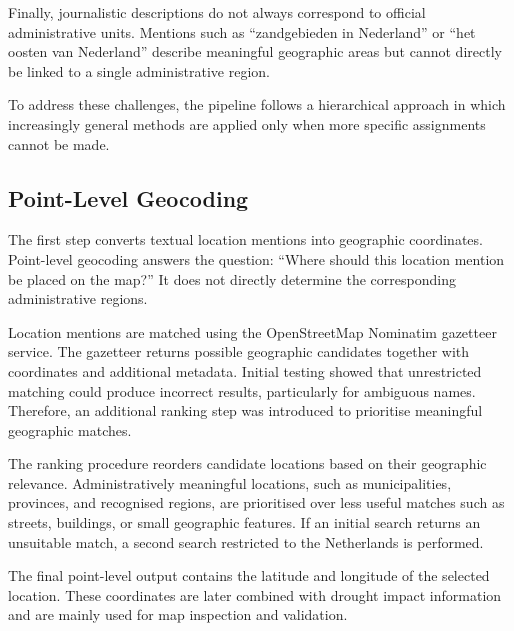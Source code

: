 Finally, journalistic descriptions do not always correspond to official administrative units. Mentions such as ``zandgebieden in Nederland'' or ``het oosten van Nederland'' describe meaningful geographic areas but cannot directly be linked to a single administrative region.

To address these challenges, the pipeline follows a hierarchical approach in which increasingly general methods are applied only when more specific assignments cannot be made.


\subsection{Point-Level Geocoding}

The first step converts textual location mentions into geographic coordinates. Point-level geocoding answers the question: ``Where should this location mention be placed on the map?'' It does not directly determine the corresponding administrative regions.

Location mentions are matched using the OpenStreetMap Nominatim gazetteer service. The gazetteer returns possible geographic candidates together with coordinates and additional metadata. Initial testing showed that unrestricted matching could produce incorrect results, particularly for ambiguous names. Therefore, an additional ranking step was introduced to prioritise meaningful geographic matches.

The ranking procedure reorders candidate locations based on their geographic relevance. Administratively meaningful locations, such as municipalities, provinces, and recognised regions, are prioritised over less useful matches such as streets, buildings, or small geographic features. If an initial search returns an unsuitable match, a second search restricted to the Netherlands is performed.

The final point-level output contains the latitude and longitude of the selected location. These coordinates are later combined with drought impact information and are mainly used for map inspection and validation.




